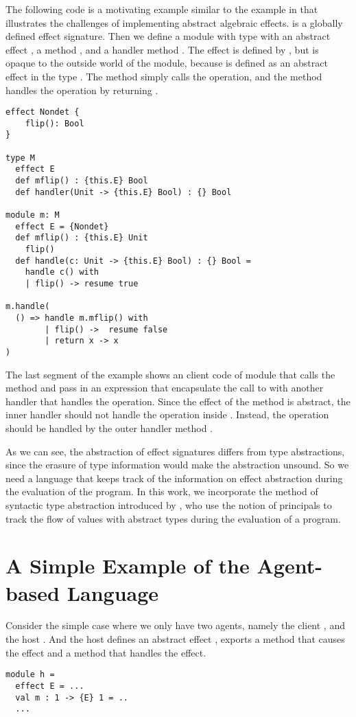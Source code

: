 The following code is a motivating example similar to the example in \cite{biernacki19} that illustrates the challenges of implementing abstract algebraic effects.  is a globally defined effect signature. Then we define a module  with type  with an abstract effect , a method , and a handler method . The effect  is defined by , but is opaque to the outside world of the module, because  is defined as an abstract effect in the type . The method  simply calls the  operation, and the  method handles the  operation by returning . 

\begin{lstlisting}[language=wyvern, float]  
effect Nondet {
    flip(): Bool  
}

type M
  effect E 
  def mflip() : {this.E} Bool
  def handler(Unit -> {this.E} Bool) : {} Bool
  
module m: M
  effect E = {Nondet}
  def mflip() : {this.E} Unit
    flip()
  def handle(c: Unit -> {this.E} Bool) : {} Bool = 
    handle c() with
    | flip() -> resume true

m.handle(
  () => handle m.mflip() with
        | flip() ->  resume false
        | return x -> x
)
\end{lstlisting}

The last segment of the  example shows an client code of module  that calls the method  and pass in an expression that encapsulate the call to  with another handler that handles the  operation. Since the effect of the method  is abstract, the inner handler should not handle the operation inside . Instead, the operation should be handled by the outer handler method .  

As we can see, the abstraction of effect signatures differs from type abstractions, since the erasure of type information would make the abstraction unsound. So we need a language that keeps track of the information on effect abstraction during the evaluation of the program. In this work, we incorporate the method of syntactic type abstraction introduced by \citet{grossman00}, who use the notion of principals to track the flow of values with abstract types during the evaluation of a program. 

\section{A Simple Example of the Agent-based Language}
Consider the simple case where we only have two agents, namely the client , and the host . And the host  defines an abstract effect , exports a method that causes the effect and a method that handles the effect.
\begin{lstlisting}[mathescape=true]
module h = 
  effect E = ...
  val m : 1 -> {E} 1 = ..
  ...
\end{lstlisting}

